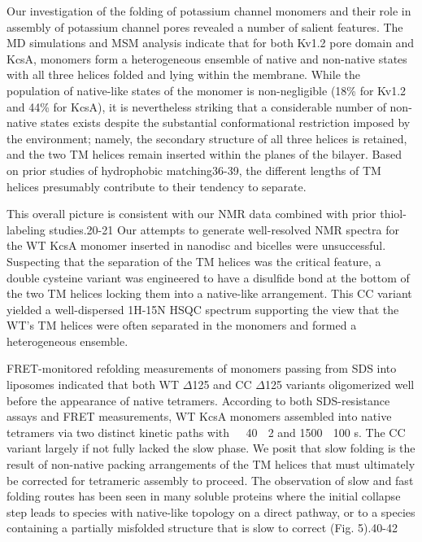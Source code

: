 Our investigation of the folding of potassium channel monomers and their role in assembly of potassium channel pores revealed a number of salient features. The MD simulations and MSM analysis indicate that for both Kv1.2 pore domain and KcsA, monomers form a heterogeneous ensemble of native and non-native states with all three helices folded and lying within the membrane. While the population of native-like states of the monomer is non-negligible (18\% for Kv1.2 and 44\% for KcsA), it is nevertheless striking that a considerable number of non-native states exists despite the substantial conformational restriction imposed by the environment; namely, the secondary structure of all three helices is retained, and the two TM helices remain inserted within the planes of the bilayer. Based on prior studies of hydrophobic matching36-39, the different lengths of TM helices presumably contribute to their tendency to separate.

This overall picture is consistent with our NMR data combined with prior thiol-labeling studies.20-21 Our attempts to generate well-resolved NMR spectra for the WT KcsA monomer inserted in nanodisc and bicelles were unsuccessful. Suspecting that the separation of the TM helices was the critical feature, a double cysteine variant was engineered to have a disulfide bond at the bottom of the two TM helices locking them into a native-like arrangement. This CC variant yielded a well-dispersed 1H-15N HSQC spectrum supporting the view that the WT’s TM helices were often separated in the monomers and formed a heterogeneous ensemble.

FRET-monitored refolding measurements of monomers passing from SDS into liposomes indicated that both WT $\Delta$125 and CC $\Delta$125 variants oligomerized well before the appearance of native tetramers. According to both SDS-resistance assays and FRET measurements, WT KcsA monomers assembled into native tetramers via two distinct kinetic paths with 40  2 and 1500  100 s. The CC variant largely if not fully lacked the slow phase. We posit that slow folding is the result of non-native packing arrangements of the TM helices that must ultimately be corrected for tetrameric assembly to proceed. The observation of slow and fast folding routes has been seen in many soluble proteins where the initial collapse step leads to species with native-like topology on a direct pathway, or to a species containing a partially misfolded structure that is slow to correct (Fig. 5).40-42

